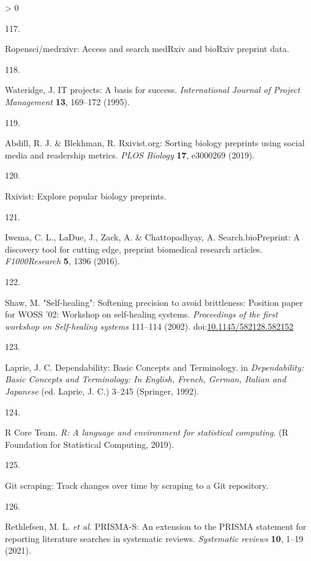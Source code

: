 \documentclass[a4paper, twoside]{templates/ociamthesis}
\newlength{\cslhangindent}
\newlength{\csllabelwidth}
\newenvironment{CSLReferences}[3] %
 {%
  \setlength{\parindent}{0pt}
  \ifodd #1 \everypar{\setlength{\hangindent}{\cslhangindent}}\ignorespaces\fi
  \ifnum #2 > 0
  \setlength{\parskip}{#2\baselineskip}
  \fi
 }%
 {}
\newcommand{\CSLLeftMargin}[1]{\parbox[t]{\maxof{\widthof{#1}}{\csllabelwidth}}{#1}}
\newcommand{\CSLRightInline}[1]{\parbox[t]{\linewidth - \csllabelwidth}{#1}}
\begin{document}
\begin{CSLReferences}{0}{0}
\leavevmode\hypertarget{ref-zotero-15029}{}%
\CSLLeftMargin{117. }
\CSLRightInline{Ropensci/medrxivr: Access and search {medRxiv} and {bioRxiv} preprint data.}

\leavevmode\hypertarget{ref-wateridge1995}{}%
\CSLLeftMargin{118. }
\CSLRightInline{Wateridge, J. {IT} projects: A basis for success. \emph{International Journal of Project Management} \textbf{13}, 169--172 (1995).}

\leavevmode\hypertarget{ref-abdill2019}{}%
\CSLLeftMargin{119. }
\CSLRightInline{Abdill, R. J. \& Blekhman, R. Rxivist.org: Sorting biology preprints using social media and readership metrics. \emph{PLOS Biology} \textbf{17}, e3000269 (2019).}

\leavevmode\hypertarget{ref-zotero-15027}{}%
\CSLLeftMargin{120. }
\CSLRightInline{Rxivist: Explore popular biology preprints.}

\leavevmode\hypertarget{ref-iwema2016}{}%
\CSLLeftMargin{121. }
\CSLRightInline{Iwema, C. L., LaDue, J., Zack, A. \& Chattopadhyay, A. Search.{bioPreprint}: A discovery tool for cutting edge, preprint biomedical research articles. \emph{F1000Research} \textbf{5}, 1396 (2016).}

\leavevmode\hypertarget{ref-shaw2002}{}%
\CSLLeftMargin{122. }
\CSLRightInline{Shaw, M. "{Self}-healing": Softening precision to avoid brittleness: Position paper for {WOSS} '02: Workshop on self-healing systems. \emph{Proceedings of the first workshop on Self-healing systems} 111--114 (2002). doi:\href{https://doi.org/10.1145/582128.582152}{10.1145/582128.582152}}

\leavevmode\hypertarget{ref-laprie1992}{}%
\CSLLeftMargin{123. }
\CSLRightInline{Laprie, J. C. Dependability: Basic {Concepts} and {Terminology}. in \emph{Dependability: Basic {Concepts} and {Terminology}: In {English}, {French}, {German}, {Italian} and {Japanese}} (ed. Laprie, J. C.) 3--245 ({Springer}, 1992).}

\leavevmode\hypertarget{ref-rcoreteam2019}{}%
\CSLLeftMargin{124. }
\CSLRightInline{R Core Team. \emph{R: A language and environment for statistical computing}. ({R Foundation for Statistical Computing}, 2019).}

\leavevmode\hypertarget{ref-zotero-15031}{}%
\CSLLeftMargin{125. }
\CSLRightInline{Git scraping: Track changes over time by scraping to a {Git} repository.}

\leavevmode\hypertarget{ref-rethlefsen2021prisma}{}%
\CSLLeftMargin{126. }
\CSLRightInline{Rethlefsen, M. L. \emph{et al.} {PRISMA}-{S}: An extension to the {PRISMA} statement for reporting literature searches in systematic reviews. \emph{Systematic reviews} \textbf{10}, 1--19 (2021).}


\end{CSLReferences}
\end{document}
